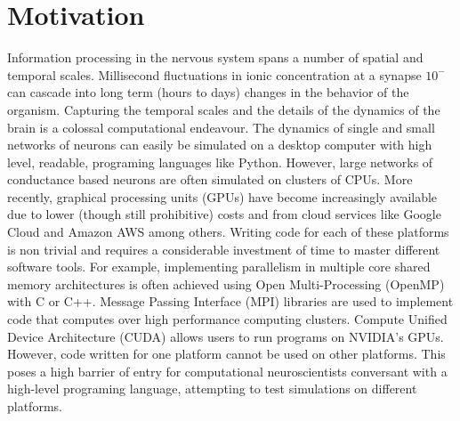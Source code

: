 \documentclass[10pt,letterpaper]{article}
\begin{document}
\section*{Motivation}
Information processing in the nervous system spans a number of spatial and temporal scales. Millisecond fluctuations in ionic concentration at a synapse $10^-$ can cascade into long term (hours to days) changes in the behavior of the organism. Capturing the temporal scales and the details of the dynamics of the brain is a colossal computational endeavour. The dynamics of single and small networks of neurons can easily be simulated on a desktop computer with high level, readable, programing languages like Python. However, large networks of conductance based neurons are often simulated on clusters of CPUs. More recently, graphical processing units (GPUs) have become increasingly available due to lower (though still prohibitive) costs and from cloud services like Google Cloud and Amazon AWS among others. Writing code for each of these platforms is non trivial and requires a considerable investment of time to master different software tools. For example, implementing parallelism in multiple core shared memory architectures is often achieved using Open Multi-Processing (OpenMP) with C or C++. Message Passing Interface (MPI) libraries are used to implement code that computes over high performance computing clusters. Compute Unified Device Architecture (CUDA) allows users to run programs on NVIDIA's GPUs. However, code written for one platform cannot be used on other platforms. This poses a high barrier of entry for computational neuroscientists conversant with a high-level programing language, attempting to test simulations on different platforms. 
\end{document}
